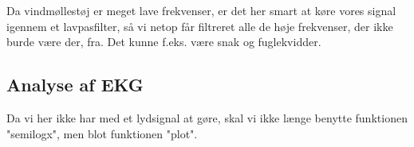 \documentclass[12pt, letterpaper]{article}
\begin{document}
\begin{figure}[!h]
           \begin{floatrow}
       
           \end{floatrow}
\end{figure}

Da vindmøllestøj er meget lave frekvenser, er det her smart at køre vores signal igennem et lavpasfilter, så vi netop får filtreret alle de høje frekvenser, der ikke burde være der, fra. Det kunne f.eks. være snak og fuglekvidder. 

\newpage


\subsection{Analyse af EKG}
Da vi her ikke har med et lydsignal at gøre, skal vi ikke længe benytte funktionen "semilogx", men blot funktionen "plot".
\end{document}

